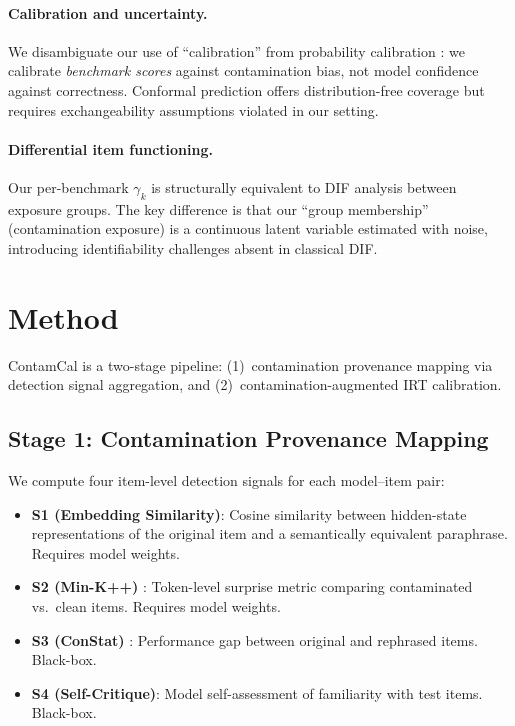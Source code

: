 \documentclass[11pt,a4paper]{article}
\begin{document}
\paragraph{Calibration and uncertainty.}
We disambiguate our use of ``calibration'' from probability calibration \cite{guo2017calibration,platt1999probabilistic}: we calibrate \emph{benchmark scores} against contamination bias, not model confidence against correctness.
Conformal prediction \cite{angelopoulos2023conformal} offers distribution-free coverage but requires exchangeability assumptions violated in our setting.

\paragraph{Differential item functioning.}
Our per-benchmark $\gamma_k$ is structurally equivalent to DIF analysis \cite{holland1993differential,thissen1993detection,zumbo1999handbook} between exposure groups.
The key difference is that our ``group membership'' (contamination exposure) is a continuous latent variable estimated with noise, introducing identifiability challenges absent in classical DIF.

\section{Method}
\label{sec:method}

ContamCal is a two-stage pipeline: (1)~contamination provenance mapping via detection signal aggregation, and (2)~contamination-augmented IRT calibration.

\subsection{Stage 1: Contamination Provenance Mapping}

We compute four item-level detection signals for each model--item pair:

\begin{itemize}
\item \textbf{S1 (Embedding Similarity)}: Cosine similarity between hidden-state representations of the original item and a semantically equivalent paraphrase. Requires model weights.
\item \textbf{S2 (Min-K++)} \cite{shi2024detecting}: Token-level surprise metric comparing contaminated vs.\ clean items. Requires model weights.
\item \textbf{S3 (ConStat)} \cite{dekoninck2024constat}: Performance gap between original and rephrased items. Black-box.
\item \textbf{S4 (Self-Critique)}: Model self-assessment of familiarity with test items. Black-box.
\end{itemize}
\end{document}
